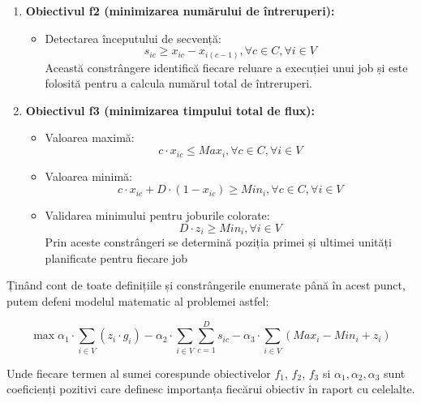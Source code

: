     \begin{enumerate}
      
    \item {\bf  Obiectivul f2 (minimizarea numărului de întreruperi):}
    \begin{itemize}
      \item Detectarea începutului de secvență:
      \begin{equation}
        s_{ic} \geq x_{ic} - x_{i(c-1)}, \forall c \in C, \forall i \in V
      \end{equation}
      Această constrângere identifică fiecare reluare a execuției unui job și este folosită pentru a calcula numărul total de întreruperi.
    \end{itemize}
   \item {\bf  Obiectivul f3 (minimizarea timpului total de flux):}
    \begin{itemize}
      \item Valoarea maximă:
      \begin{equation}
        c \cdot x_{ic} \leq Max_i, \forall c \in C, \forall i \in V
      \end{equation}
      \item Valoarea minimă:
      \begin{equation}
        c \cdot x_{ic} + D \cdot (1-x_{ic}) \geq Min_i, \forall c \in C, \forall i \in V
      \end{equation}
      \item Validarea minimului pentru joburile colorate:
      \begin{equation}
        D \cdot z_i \geq Min_i, \forall i \in V
      \end{equation}
      Prin aceste constrângeri se determină poziția primei și ultimei unități planificate pentru fiecare job
    \end{itemize}
        \end{enumerate}

    Ținând cont de toate definițiile și constrângerile enumerate până în acest punct, putem defeni modelul matematic al problemei astfel:
    \begin{Def}
      \begin{equation}
        \max  \alpha_1 \cdot \sum_{i \in V} (z_i \cdot g_i) - \alpha_2 \cdot \sum_{i \in V} \sum_{c=1}^{D} s_{ic}  - \alpha_3 \cdot \sum_{i \in V} (Max_i - Min_i + z_i)
      \end{equation}
    \end{Def}
     Unde fiecare termen al sumei corespunde obiectivelor $f_1$, $f_2$, $f_3$ si $\alpha_1, \alpha_2, \alpha_3$ sunt coeficienți pozitivi care definesc importanța fiecărui obiectiv în raport cu celelalte.

